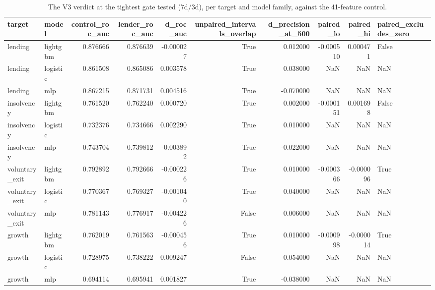 \begin{table}
\caption{The V3 verdict at the tightest gate tested (7d/3d), per target and model family, against the 41-feature control.}
\label{tab:19_verdict_by_model}
\begin{tabular}{llrrrrrrrl}
\toprule
target & model & control_roc_auc & lender_roc_auc & d_roc_auc & unpaired_intervals_overlap & d_precision_at_500 & paired_lo & paired_hi & paired_excludes_zero \\
\midrule
lending & lightgbm & 0.876666 & 0.876639 & -0.000027 & True & 0.012000 & -0.000510 & 0.000471 & False \\
lending & logistic & 0.861508 & 0.865086 & 0.003578 & True & 0.038000 & NaN & NaN & NaN \\
lending & mlp & 0.867215 & 0.871731 & 0.004516 & True & -0.070000 & NaN & NaN & NaN \\
insolvency & lightgbm & 0.761520 & 0.762240 & 0.000720 & True & 0.002000 & -0.000151 & 0.001698 & False \\
insolvency & logistic & 0.732376 & 0.734666 & 0.002290 & True & 0.010000 & NaN & NaN & NaN \\
insolvency & mlp & 0.743704 & 0.739812 & -0.003892 & True & -0.022000 & NaN & NaN & NaN \\
voluntary_exit & lightgbm & 0.792892 & 0.792666 & -0.000226 & True & 0.010000 & -0.000366 & -0.000096 & True \\
voluntary_exit & logistic & 0.770367 & 0.769327 & -0.001040 & True & 0.040000 & NaN & NaN & NaN \\
voluntary_exit & mlp & 0.781143 & 0.776917 & -0.004226 & False & 0.006000 & NaN & NaN & NaN \\
growth & lightgbm & 0.762019 & 0.761563 & -0.000456 & True & 0.010000 & -0.000998 & -0.000014 & True \\
growth & logistic & 0.728975 & 0.738222 & 0.009247 & False & 0.054000 & NaN & NaN & NaN \\
growth & mlp & 0.694114 & 0.695941 & 0.001827 & True & -0.038000 & NaN & NaN & NaN \\
\bottomrule
\end{tabular}
\end{table}
